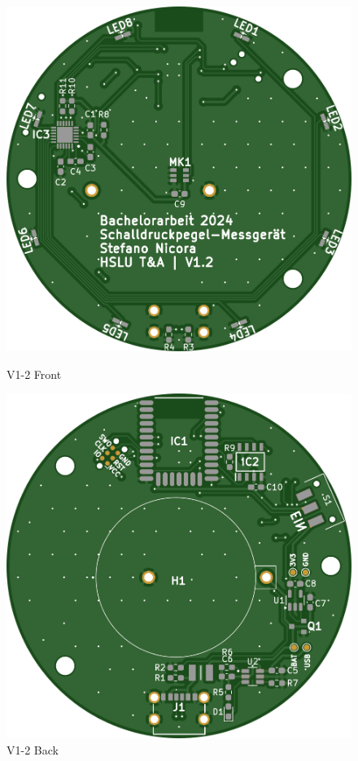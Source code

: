 \documentclass[12pt]{article}
\begin{document}
	\begin{figure}[H]
		\centering
		\begin{minipage}{.5\textwidth}
			\thispagestyle{empty} 
			\centering
			\includegraphics[width=1\linewidth]{images/BAT_PCB_V1-2_top}
			\caption[]{V1-2 Front}
			\label{fig:pcb_V1-2_front}
		\end{minipage}%
		\begin{minipage}{.5\textwidth}
			\thispagestyle{empty} 
			\centering
			\includegraphics[width=1\linewidth]{images/BAT_PCB_V1-2_bottom}
			\caption[]{V1-2 Back}
			\label{fig:pcb_V1-2_back}
		\end{minipage}
	\end{figure}
\end{document}
